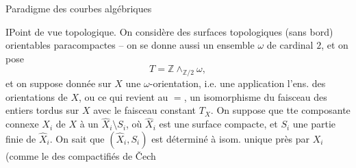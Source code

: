 Paradigme des courbes algébriques

I\quad Point de vue topologique.
On considère des surfaces topologiques (sans bord)
orientables paracompactes  -- on se donne
 aussi un ensemble $\omega$ de cardinal $2$,
et on pose
\[T=\mathbb Z\wedge_{\mathbb Z/2}\omega,\]
et on suppose donnée sur $X$ une $\omega$-orientation,
i.e. une application
l'ens. des orientations de $X$, ou ce
qui revient au $=$, un isomorphisme
du faisceau des entiers tordus sur $X$
avec le faisceau constant $T_X$.
On suppose que tte composante connexe
$X_i$ de $X$   à un
$\widehat X_i\setminus S_i$, où $\widehat X_i$ est une surface
compacte, et $S_i$ une partie finie de
$\widehat X_i$. On sait que $(\widehat X_i,S_i)$ est déterminé
à isom. unique près par $X_i$
(comme le  des compactifiés de Čech
